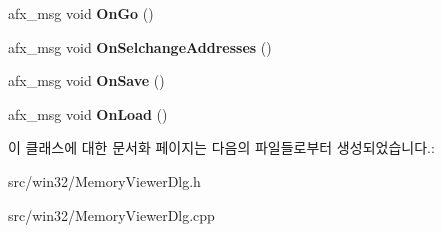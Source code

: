 \begin{DoxyCompactItemize}
afx\+\_\+msg void {\bfseries On\+Go} ()
\item 
\mbox{\label{class_memory_viewer_dlg_ab7624247967998f1973da99a035a28e3}} 
afx\+\_\+msg void {\bfseries On\+Selchange\+Addresses} ()
\item 
\mbox{\label{class_memory_viewer_dlg_aaa3651f618355f6d1d3bf3158cb9c812}} 
afx\+\_\+msg void {\bfseries On\+Save} ()
\item 
\mbox{\label{class_memory_viewer_dlg_adfc256215ade1d48a24a3eb72b3ecfed}} 
afx\+\_\+msg void {\bfseries On\+Load} ()
\end{DoxyCompactItemize}


이 클래스에 대한 문서화 페이지는 다음의 파일들로부터 생성되었습니다.\+:\begin{DoxyCompactItemize}
\item 
src/win32/Memory\+Viewer\+Dlg.\+h\item 
src/win32/Memory\+Viewer\+Dlg.\+cpp\end{DoxyCompactItemize}

